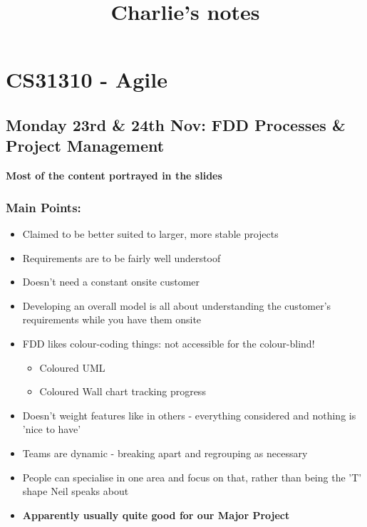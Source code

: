 \documentclass[paper=a4, fontsize=11pt]{article} %
\numberwithin{equation}{section} %
\numberwithin{figure}{section} %
\numberwithin{table}{section} %
\begin{document}
\title{Charlie's notes}

\maketitle

\section{CS31310 - Agile}

\subsection{Monday 23rd \& 24th Nov: FDD Processes \& Project Management}

\textbf{Most of the content portrayed in the slides}

\subsubsection{Main Points:}
\begin{itemize}
\item Claimed to be better suited to larger, more stable projects
\item Requirements are to be fairly well understoof
\item Doesn't need a constant onsite customer
\item Developing an overall model is all about understanding the customer's requirements while you have them onsite
\item FDD likes colour-coding things: not accessible for the colour-blind!
	\begin{itemize}
	\item Coloured UML
	\item Coloured Wall chart tracking progress
	\end{itemize}
\item Doesn't weight features like in others - everything considered and nothing is 'nice to have' 
\item Teams are dynamic - breaking apart and regrouping as necessary
\item People can specialise in one area and focus on that, rather than being the 'T' shape Neil speaks about
\item \textbf{Apparently usually quite good for our Major Project}
\end{itemize}
\end{document}
